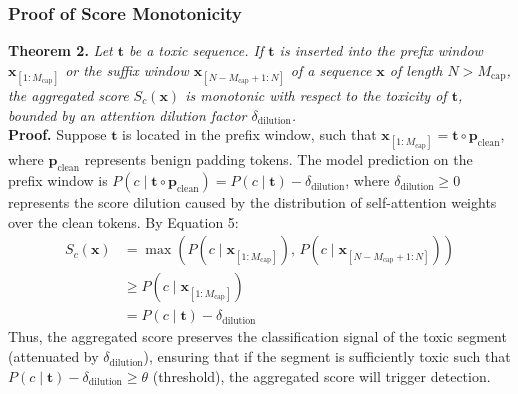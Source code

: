 \documentclass[10pt]{article}
\begin{document}
\subsubsection{Proof of Score Monotonicity}
\textbf{Theorem 2.} \textit{Let $\mathbf{t}$ be a toxic sequence. If $\mathbf{t}$ is inserted into the prefix window $\mathbf{x}_{[1:M_{\text{cap}}]}$ or the suffix window $\mathbf{x}_{[N-M_{\text{cap}}+1:N]}$ of a sequence $\mathbf{x}$ of length $N > M_{\text{cap}}$, the aggregated score $S_c(\mathbf{x})$ is monotonic with respect to the toxicity of $\mathbf{t}$, bounded by an attention dilution factor $\delta_{\text{dilution}}$.}
\\
\textbf{Proof.}
Suppose $\mathbf{t}$ is located in the prefix window, such that $\mathbf{x}_{[1:M_{\text{cap}}]} = \mathbf{t} \circ \mathbf{p}_{\text{clean}}$, where $\mathbf{p}_{\text{clean}}$ represents benign padding tokens. The model prediction on the prefix window is $P(c \mid \mathbf{t} \circ \mathbf{p}_{\text{clean}}) = P(c \mid \mathbf{t}) - \delta_{\text{dilution}}$, where $\delta_{\text{dilution}} \ge 0$ represents the score dilution caused by the distribution of self-attention weights over the clean tokens.
By Equation 5:
\begin{align}
S_c(\mathbf{x}) &= \max\left( P(c \mid \mathbf{x}_{[1:M_{\text{cap}}]}), \, P(c \mid \mathbf{x}_{[N-M_{\text{cap}}+1:N]}) \right) \\
&\ge P(c \mid \mathbf{x}_{[1:M_{\text{cap}}]}) \\
&= P(c \mid \mathbf{t}) - \delta_{\text{dilution}}
\end{align}
Thus, the aggregated score preserves the classification signal of the toxic segment (attenuated by $\delta_{\text{dilution}}$), ensuring that if the segment is sufficiently toxic such that $P(c \mid \mathbf{t}) - \delta_{\text{dilution}} \ge \theta$ (threshold), the aggregated score will trigger detection.
\end{document}
